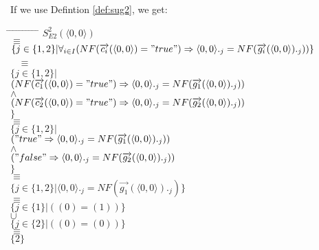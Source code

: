 \index{}\documentclass[a4paper,10pt]{article}
\theoremstyle{plain}
\theoremstyle{definition}
\newcommand{\ovr}{\overrightarrow}
\begin{document}
\begin{defn}
\begin{example} [Let $E2$ be]
\begin{verbatim}
\end{verbatim}
\end{example}
If we use Defintion \ref{def:sug2}, we get:
\begin{tabbing}
\hspace*{5.mm} \= \hspace*{5.mm} \= \hspace*{5.mm} \= \hspace*{5.mm} \= \hspace*{5.mm} \= \hspace*{5.mm}  \= \hspace*{5.mm}  \= \hspace*{5.mm}  \= \hspace*{5.mm} \= \hspace*{5.mm} \= \hspace*{5.mm}\kill
\> \> $S_{E2}^2(\langle 0, 0 \rangle)$\\
\> $\equiv$\\
\> \> $\lbrace j \in \lbrace 1, 2 \rbrace \vert \forall_{i\in I} (NF(\ovr{c_i}( \langle  0,  0\rangle ) = "true") \Rightarrow  \langle  0,  0\rangle._j = NF(\ovr{g_i}( \langle  0,  0\rangle)._j))\rbrace $\\\
\> $\equiv$ \\
\> \>$\lbrace j \in \lbrace 1, 2 \rbrace \vert $ \\
\> \> \> $(NF(\ovr{c_1}( \langle  0,  0\rangle ) = "true") \Rightarrow  \langle  0,  0\rangle._j = NF(\ovr{g_{1}}( \langle  0,  0\rangle)._j)) $\\
\> \> \> $\wedge$ \\
\> \> \> $ (NF(\ovr{c_2}( \langle  0,  0\rangle ) = "true") \Rightarrow  \langle  0,  0\rangle._j = NF(\ovr{g_{2}}( \langle  0,  0\rangle)._j)) $ \\
\> \>$
\rbrace $\\
\> $\equiv$ \\
\> \> $\lbrace j \in \lbrace 1, 2 \rbrace \vert $\\
\> \> \> $("true" \Rightarrow  \langle  0,  0\rangle._j = NF(\ovr{g_{1}}( \langle  0,  0\rangle)._j))$ \\
\> \> \> $\wedge$ \\
\> \> \> $("false" \Rightarrow  \langle  0,  0\rangle._j = NF(\ovr{g_{2}}( \langle  0,  0\rangle)._j))$ \\
\> \> $\rbrace $\\
\> $\equiv$ \\
\> \> $\lbrace j \in \lbrace 1, 2 \rbrace \vert 
\langle  0,  0\rangle._j = NF(\ovr{g_1}( \langle  0,  0\rangle)._j)
\rbrace $\\
\> $\equiv$\\
\> \> $\lbrace j \in \lbrace 1 \rbrace \vert (( 0)  = ( 1)) \rbrace $\\
\> \> $\cup$ \\
\> \> $\lbrace j \in \lbrace 2 \rbrace \vert (( 0)  = ( 0)) \rbrace $\\
\> $\equiv $ \\
\> \> $\lbrace 2 \rbrace$ \\
\end{tabbing}


\end{defn}
\end{document}

